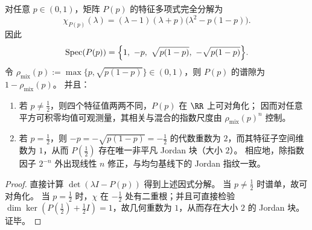 \begin{proposition}[转移谱的完全分解与 \texorpdfstring{$p=\tfrac12$}{p=1/2} 的唯一 Jordan 共振]\label{prop:fold-gauge-anomaly-bernoulli-p-spectrum}
对任意 \(p\in(0,1)\)，矩阵 \(P(p)\) 的特征多项式完全分解为
\[
\chi_{P(p)}(\lambda)=(\lambda-1)(\lambda+p)\bigl(\lambda^2-p(1-p)\bigr).
\]
因此
\[
\mathrm{Spec}(P(p))=\Bigl\{1,\ -p,\ \sqrt{p(1-p)},\ -\sqrt{p(1-p)}\Bigr\}.
\]
令 \(\rho_{\mathrm{mix}}(p):=\max\{p,\sqrt{p(1-p)}\}\in(0,1)\)，则 \(P(p)\) 的谱隙为 \(1-\rho_{\mathrm{mix}}(p)\)。
并且：
\begin{enumerate}
  \item 若 \(p\neq\tfrac12\)，则四个特征值两两不同，\(P(p)\) 在 \(\RR\) 上可对角化；
  因而对任意平方可积零均值可观测量，其相关与混合的指数尺度由 \(\rho_{\mathrm{mix}}(p)^n\) 控制。
  \item 若 \(p=\tfrac12\)，则 \(-p=-\sqrt{p(1-p)}=-\tfrac12\) 的代数重数为 \(2\)，而其特征子空间维数为 \(1\)，从而 \(P(\tfrac12)\) 存在唯一非平凡 Jordan 块（大小 \(2\)）。
  相应地，除指数因子 \(2^{-n}\) 外出现线性 \(n\) 修正，与均匀基线下的 Jordan 指纹一致。
\end{enumerate}
\end{proposition}
\begin{proof}
直接计算 \(\det(\lambda I-P(p))\) 得到上述因式分解。
当 \(p\neq\tfrac12\) 时谱单，故可对角化。
当 \(p=\tfrac12\) 时，\(\chi\) 在 \(-\tfrac12\) 处有二重根；并且可直接检验
\(\dim\ker(P(\tfrac12)+\tfrac12 I)=1\)，故几何重数为 \(1\)，从而存在大小 \(2\) 的 Jordan 块。证毕。
\end{proof}

